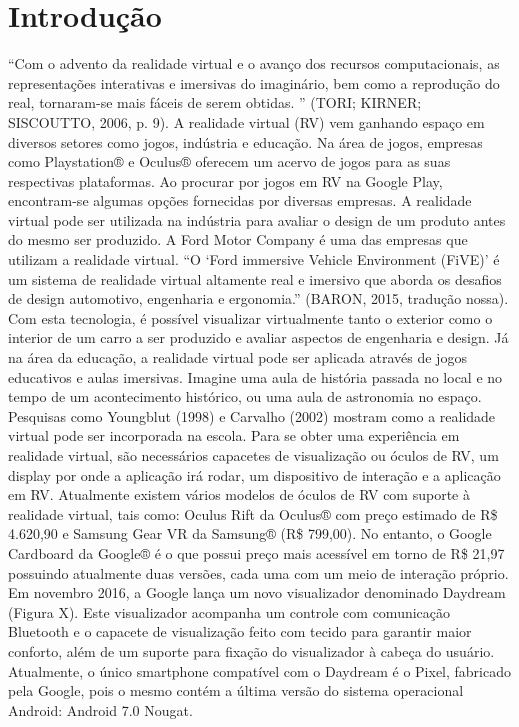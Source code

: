 \chapter{Introdução}
\label{c.introducao}

“Com o advento da realidade virtual e o avanço dos recursos computacionais, as representações interativas e imersivas do imaginário, bem como a reprodução do real, tornaram-se mais fáceis de serem obtidas. ” (TORI; KIRNER; SISCOUTTO, 2006, p. 9).
A realidade virtual (RV) vem ganhando espaço em diversos setores como jogos, indústria e educação. Na área de jogos, empresas como Playstation® e Oculus® oferecem um acervo de jogos para as suas respectivas plataformas. Ao procurar por jogos em RV na Google Play, encontram-se algumas opções fornecidas por diversas empresas.
A realidade virtual pode ser utilizada na indústria para avaliar o design de um produto antes do mesmo ser produzido. A Ford Motor Company é uma das empresas que utilizam a realidade virtual. “O ‘Ford immersive Vehicle Environment (FiVE)’ é um sistema de realidade virtual altamente real e imersivo que aborda os desafios de design automotivo, engenharia e ergonomia.” (BARON, 2015, tradução nossa). Com esta tecnologia, é possível visualizar virtualmente tanto o exterior como o interior de um carro a ser produzido e avaliar aspectos de engenharia e design.
Já na área da educação, a realidade virtual pode ser aplicada através de jogos educativos e aulas imersivas. Imagine uma aula de história passada no local e no tempo de um acontecimento histórico, ou uma aula de astronomia no espaço. Pesquisas como Youngblut (1998) e Carvalho (2002) mostram como a realidade virtual pode ser incorporada na escola.
Para se obter uma experiência em realidade virtual, são necessários capacetes de visualização ou óculos de RV, um display por onde a aplicação irá rodar, um dispositivo de interação e a aplicação em RV. 
Atualmente existem vários modelos de óculos de RV com suporte à realidade virtual, tais como: Oculus Rift da Oculus® com preço estimado de R\$ 4.620,90 e Samsung Gear VR da Samsung® (R\$ 799,00). No entanto, o Google Cardboard da Google® é o que possui preço mais acessível em torno de R\$ 21,97 possuindo atualmente duas versões, cada uma com um meio de interação próprio. Em novembro 2016, a Google lança um novo visualizador denominado Daydream (Figura X). Este visualizador acompanha um controle com comunicação Bluetooth e o capacete de visualização feito com tecido para garantir maior conforto, além de um suporte para fixação do visualizador à cabeça do usuário. Atualmente, o único smartphone compatível com o Daydream é o Pixel, fabricado pela Google, pois o mesmo contém a última versão do sistema operacional Android: Android 7.0 Nougat.
